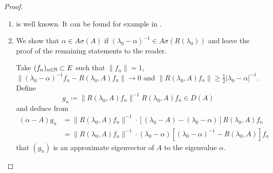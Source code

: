 \begin{proof}
\begin{enumerate}[\upshape (i), wide, labelindent=.5em]
\item 
is well known. It can be found for example in \citet[VII.9.2]{dunfordschwartz:1958}.

\item 
We show that $\alpha \in A\sigma(A)$ if $(\lambda_{0}-\alpha)^{-1} \in A\sigma(R(\lambda_{0}))$ and leave the proof of the remaining statements to the reader.

Take $(f_{n})_{n \in \mathbb{N}} \subset E$ such that $\|f_{n}\| = 1$, $\|(\lambda_{0}-\alpha)^{-1}f_{n} - R(\lambda_{0},A)f_{n}\| \to 0$ and $\|R(\lambda_{0},A)f_{n}\| \geq \frac{1}{2}|\lambda_{0} - \alpha|^{-1}$.
Define
\[
g_{n} \coloneqq \|R(\lambda_{0},A)f_{n}\|^{-1}R(\lambda_{0},A)f_{n} \in D(A)
\]
and deduce from
\begin{align*}
(\alpha-A)g_{n} &= \|R(\lambda_{0},A)f_{n}\|^{-1} \cdot 
		[(\lambda_{0}-A) - (\lambda_{0}-\alpha)]R(\lambda_{0},A)f_{n} \\  
	&= \|R(\lambda_{0},A)f_{n}\|^{-1} \cdot 			(\lambda_{0}-\alpha)[(\lambda_{0}-\alpha)^{-1} - R(\lambda_{0},A)]f_{n}
\end{align*}
that $(g_{n})$ is an approximate eigenvector of $A$ to the eigenvalue $\alpha$.


\end{enumerate}
\end{proof}
